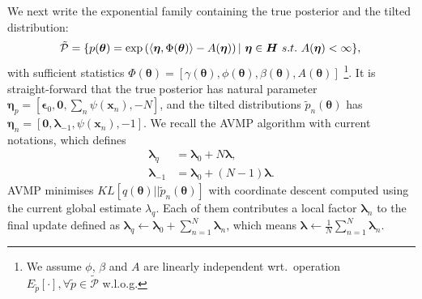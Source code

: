 \documentclass{article} %
\begin{document}
We next write the exponential family containing the true posterior and the tilted distribution:
\begin{equation}
\mathcal{\tilde{P}} = \{p(\bm{\theta}) = \exp \left( \langle \bm{\eta}, \Phi(\bm{\theta}) \rangle - A(\bm{\eta}) \right) |\ \bm{\eta} \in \bm{H} \ s.t.~ A(\bm{\eta}) < \infty \}, \\
\end{equation}
with sufficient statistics $\Phi(\bm{\theta}) = [\gamma(\bm{\theta}), \phi(\bm{\theta}), \beta(\bm{\theta}), A(\bm{\theta})]$ \footnote{We assume $\phi$, $\beta$ and $A$ are linearly independent wrt.~operation $E_{\tilde{p}}[\cdot], \forall \tilde{p} \in \tilde{\mathcal{P}}$ w.l.o.g.}. It is straight-forward that the true posterior has natural parameter $\bm{\eta}_p = [\bm{\epsilon}_0, \bm{0},\sum_{n} \psi(\bm{x}_n), -N]$, and the tilted distributions $\tilde{p}_n(\bm{\theta})$ has $\bm{\eta}_n = [\bm{0}, \bm{\lambda}_{-1}, \psi(\bm{x}_n), -1]$. 
%
We recall the AVMP algorithm with current notations, which defines
\begin{align}
\bm{\lambda}_q &= \bm{\lambda}_0 + N \bm{\lambda}, \\
\bm{\lambda}_{-1} & = \bm{\lambda}_0 + (N-1) \bm{\lambda}.
\end{align}
AVMP minimises $KL[q(\bm{\theta}) || \tilde{p}_n(\bm{\theta})]$ with coordinate descent computed using the current global estimate $\lambda_q$. Each of them contributes a local factor $\bm{\lambda}_n$ to the final update defined as $\bm{\lambda}_q \leftarrow \bm{\lambda}_0 + \sum_{n=1}^N \bm{\lambda}_n$, which means $\bm{\lambda} \leftarrow \frac{1}{N} \sum_{n=1}^N \bm{\lambda}_n$.
\end{document}
